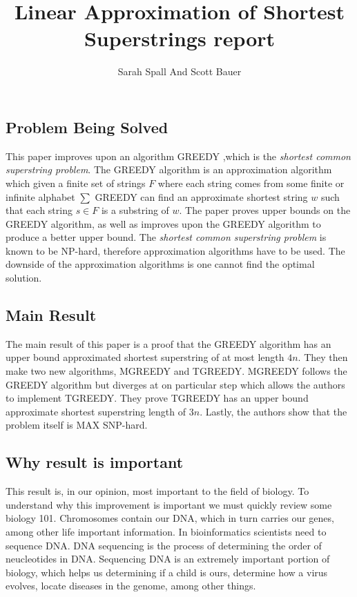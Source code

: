 \documentclass[letterpaper,twocolumn,11pt,titlepage]{article}
\title{Linear Approximation of Shortest Superstrings report}
\author[1]{Sarah Spall And Scott Bauer}
\begin{document}
\maketitle


\subsection*{Problem Being Solved}

This paper improves upon an algorithm GREEDY \cite{tarhio1988greedy},which is the \textit{shortest common superstring problem}. The GREEDY algorithm is an approximation algorithm which given a finite set of strings $F$ where each string comes from some finite or infinite alphabet $\sum$ GREEDY can find an approximate shortest string $w$ such that each string $s \in F$ is a substring of $w$. The paper proves upper bounds on the GREEDY algorithm, as well as improves upon the GREEDY algorithm to produce a better upper bound. The  \textit{shortest common superstring problem} is known to be NP-hard, therefore approximation algorithms have to be used. The downside of the approximation algorithms is one cannot find the optimal solution.  \cite{gallant1980finding}
 


\subsection*{Main Result}

The main result of this paper is a proof that the GREEDY algorithm has an upper bound approximated shortest superstring of at most length $4n$. They then make two new algorithms, MGREEDY and TGREEDY. MGREEDY follows the GREEDY algorithm but diverges at on particular step which allows the authors to implement TGREEDY. They prove TGREEDY has an upper bound approximate shortest superstring length of $3n$. Lastly, the authors show that the problem itself is MAX SNP-hard.

\subsection*{Why result is important}

This result is, in our opinion, most important to the field of biology. To understand why this improvement is important we must quickly review some biology 101. Chromosomes contain our DNA, which in turn carries our genes, among other life important information. In bioinformatics scientists need to sequence DNA. DNA sequencing is the process of determining the order of neucleotides in DNA. Sequencing DNA is an extremely important portion of biology, which helps us determining if a child is ours, determine how a virus evolves, locate diseases in the genome, among other things.
\end{document}
